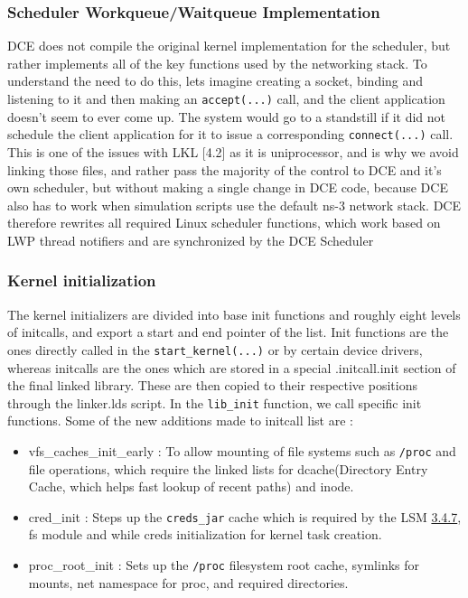 \documentclass{sig-alternate}
\begin{document}
\subsubsection{Scheduler Workqueue/Waitqueue Implementation}
DCE does not compile the 
original kernel implementation for the scheduler, but rather implements all of the key functions used by the networking stack. 
To understand the need to do this, lets imagine creating a socket, binding and listening to it and then making an \texttt{accept(...)} call, 
and the client application doesn’t seem to ever come up. The system would go to a standstill if it did not schedule the client application for it to issue a 
corresponding \texttt{connect(...)} call. This is one of the issues with LKL [4.2] as it is uniprocessor,
and is why we avoid linking those files, and 
rather pass the majority of the control to DCE and it's own scheduler, but without making a single change in DCE code, 
because DCE also has to work when simulation scripts use the default ns-3 network stack.  
DCE therefore rewrites all required Linux scheduler functions, which work based on LWP thread notifiers and are synchronized by 
the DCE Scheduler

\subsubsection{Kernel initialization}
The kernel initializers are divided into base init functions and roughly eight levels of initcalls, and export a start and end pointer of the list. 
Init functions are the ones directly called in the \texttt{start\_kernel(...)} or by certain device drivers, whereas initcalls are the ones which are stored 
in a special .initcall.init section of the final linked library. These are then copied to their respective positions through the linker.lds script.
In the \texttt{lib\_init} function, we call specific init functions. Some of the new additions made to initcall list are : 

\begin{itemize}
  \item vfs\_caches\_init\_early : To allow mounting of file systems such as \texttt{/proc} and file operations, which require the linked lists for 
  dcache(Directory Entry Cache, which helps fast lookup of recent paths) and inode.
  \item cred\_init : Steps up the \texttt{creds\_jar} cache which is required by the LSM \hyperref[Section_LSM]{3.4.7}, fs module and 
  while creds initialization for kernel task creation.
  \item proc\_root\_init : Sets up the \texttt{/proc} filesystem root cache, symlinks for mounts, net namespace for proc, and required directories.
\end{itemize}
\end{document}
